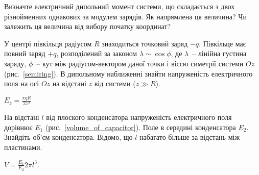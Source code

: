 \begin{problem}
    Визначте електричний дипольний момент системи, що складається з двох різнойменних однакових за модулем зарядів. Як напрямлена ця величина? Чи залежить ця величина від вибору початку координат?
\end{problem}


\begin{problem}\label{prb:semiring}
У центрі півкільця радіусом $R$ знаходиться точковий заряд $-q$. Півкільце має повний заряд $+ q$, розподілений за законом $\lambda\sim\cos\phi $, де $\lambda$~-- лінійна густина заряду, $\phi$~-- кут між радіусом-вектором даної точки і віссю симетрії системи $Oz$ (рис.~\ref{semiring}). В дипольному наближенні знайти напруженість електричного поля на осі $Oz$ на відстані $z$ від системи ($z \gg R$).
\begin{solution}
	$E_z = \frac{\pi qR}{2z^3}$
\end{solution}
\end{problem}

\begin{problem}\label{prb:volume_of_capacitor}
На відстані $l$ від плоского конденсатора напруженість електричного поля дорівнює $E_1$ (рис.~\ref{volume_of_capacitor}). Поле в середині конденсатора $E_2$. Знайдіть об'єм конденсатора. Відомо, що $l$ набагато більше за відстань між пластинами.
\begin{solution}
	$V = \frac{E_1}{E_2}2\pi l^3$.
\end{solution}
\end{problem}

